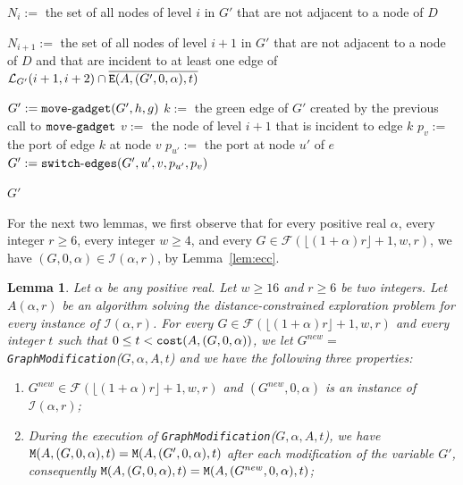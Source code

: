 \documentclass[11pt]{article}
\newtheorem{lemma}{Lemma}[section]
\begin{document}
{\begin{algorithm}[H]
{{$N_i :=$ the set of all nodes of level $i$ in $G'$ that are not adjacent to a node of $D$\;

$N_{i+1} :=$ the set of all nodes of level $i+1$ in $G'$ that are not adjacent to a node of $D$ and that are incident to at least one edge of $\mathcal{L}_{G'}(i+1,i+2)\cap\overline{{\tt E}(A,(G',0,\alpha),t)}$\;

{
$G' := {\tt move\mbox{-}gadget}(G',h,g)$\;\label{ligne:modif:4} 
$k :=$ the green edge of $G'$ created by the previous call to ${\tt move\mbox{-}gadget}$\;\label{ligne:yoyo} \label{ligne:18}
$v :=$ the node of level $i+1$ that is incident to edge $k$\;
$p_{v} :=$ the port of edge $k$ at node $v$\;
$p_{u'} :=$ the port at node $u'$ of $e$\;
$G' := {\tt switch\mbox{-}edges}(G',u',v,p_{u'},p_v)$\;\label{ligne:modif:3}
  }
	}
}
\Return $G'$\;\label{ligne:fin}\label{ligne:23}
\end{algorithm}


For the next two lemmas, we first observe that for every positive real
$\alpha$, every integer $r \geq 6$, every integer $w\geq 4$, and every
$G \in \mathcal{F}(\lfloor(1+\alpha)r\rfloor+1,w,r)$, we have
$(G,0,\alpha) \in \mathcal{I}(\alpha,r)$, by Lemma~\ref{lem:ecc}. 

\begin{lemma}
  \label{lem:adv1}
  Let $\alpha$ be any positive real. Let $w \geq 16$ and $r\geq 6$ be
  two integers.
Let $A(\alpha,r)$ be an algorithm solving the
  distance-constrained exploration problem for every instance of
  $\mathcal{I}(\alpha,r)$.
For every $G\in\mathcal{F}(\lfloor(1+\alpha)r\rfloor+1,w,r)$ and every integer $t$ such that $0\leq t < {\tt
    cost}(A,(G,0,\alpha))$, we let $G^{new} = $ {\tt GraphModification}($G,\alpha,A,t$) and we have the following
  three properties:
\begin{enumerate}

\item $G^{new}\in\mathcal{F}(\lfloor(1+\alpha)r\rfloor+1,w,r)$ and
  $(G^{new},0,\alpha)$ is an instance of $\mathcal{I}(\alpha,r)$;
  
\item During the execution of {\tt GraphModification}($G,\alpha,A,t$), we have 
  ${\tt M}(A,(G,0,\alpha),t)={\tt M}(A,(G',0,\alpha),t)$ after each
  modification of the variable $G'$, consequently ${\tt M}(A,(G,0,\alpha),t)={\tt M}(A,(G^{new},0,\alpha),t)$;


\end{enumerate}
\end{lemma}}
\end{document}
